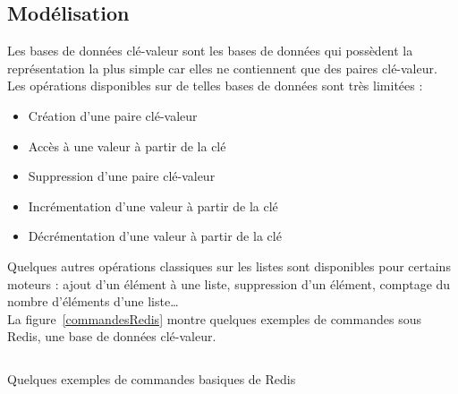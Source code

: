 \subsection{Modélisation}
	Les bases de données clé-valeur sont les bases de données qui possèdent la représentation la plus simple car elles ne contiennent que des paires clé-valeur. Les opérations disponibles sur de telles bases de données sont très limitées :
	\vspace{10px}
	\begin{itemize}
		\item Création d'une paire clé-valeur 
		\item Accès à une valeur à partir de la clé
		\item Suppression d'une paire clé-valeur
		\item Incrémentation d'une valeur à partir de la clé
		\item Décrémentation d'une valeur à partir de la clé
	\end{itemize}
	\vspace{20px}
	Quelques autres opérations classiques sur les listes sont disponibles pour certains moteurs : ajout d'un élément à une liste, suppression d'un élément, comptage du nombre d'éléments d'une liste\dots\\

	La figure~\ref{commandesRedis} montre quelques exemples de commandes sous Redis, une base de données clé-valeur.

	\begin{listing}[H]
		\inputminted{text}{code/commandesRedis.txt}
		\caption{Quelques exemples de commandes basiques de Redis}
		\label{commandesRedis}
	\end{listing}

